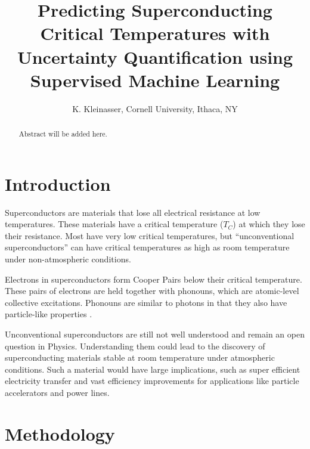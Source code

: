 \documentclass[twocolumn, nofootinbib, secnumarabic, amssymb, nobibnotes, aps, prd]{revtex4-2}
\begin{document}
%

\begin{abstract} %
Abstract will be added here.
\end{abstract}


\title{Predicting Superconducting Critical Temperatures with Uncertainty Quantification using Supervised Machine Learning}

\author{K. Kleinasser, Cornell University, Ithaca, NY}

\maketitle

\section{Introduction}
Superconductors are materials that lose all electrical resistance at low temperatures. These materials have a critical temperature ($T_C$) at which they lose their resistance. Most have very low critical temperatures, but “unconventional superconductors” can have critical temperatures as high as room temperature under non-atmospheric conditions. 

Electrons in superconductors form Cooper Pairs below their critical temperature. These pairs of electrons are held together with phonouns, which are atomic-level collective excitations. Phonouns are similar to photons in that they also have particle-like properties \cite{rohlf_1994}.

Unconventional superconductors are still not well understood and remain an open question in Physics. Understanding them could lead to the discovery of superconducting materials stable at room temperature under atmospheric conditions. Such a material would have large implications, such as super efficient electricity transfer and vast efficiency improvements for applications like particle accelerators and power lines.



\section{Methodology}
\end{document}
